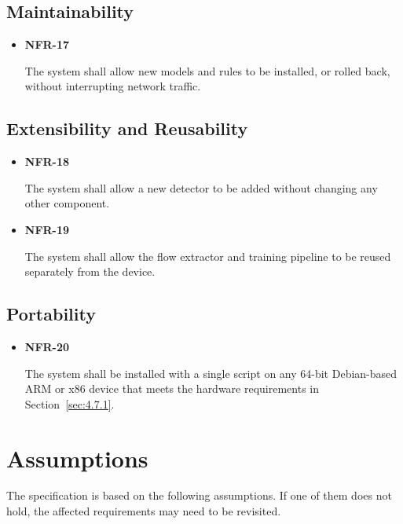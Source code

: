\subsection{Maintainability}\label{sec:4.4.9}

\begin{itemize}
\item \hypertarget{req:NFR-17}{\textbf{NFR-17}} The system shall allow new models and rules to be installed, or rolled back, without interrupting network traffic.
\end{itemize}

\subsection{Extensibility and Reusability}\label{sec:4.4.10}

\begin{itemize}
\item \hypertarget{req:NFR-18}{\textbf{NFR-18}} The system shall allow a new detector to be added without changing any other component.
\item \hypertarget{req:NFR-19}{\textbf{NFR-19}} The system shall allow the flow extractor and training pipeline to be reused separately from the device.
\end{itemize}

\subsection{Portability}\label{sec:4.4.11}

\begin{itemize}
\item \hypertarget{req:NFR-20}{\textbf{NFR-20}} The system shall be installed with a single script on any 64-bit Debian-based ARM or x86 device that meets the hardware requirements in Section~\ref{sec:4.7.1}.
\end{itemize}

\section{Assumptions}\label{sec:4.5}

\noindent The specification is based on the following assumptions. If one of them does not hold, the affected requirements may need to be revisited.

